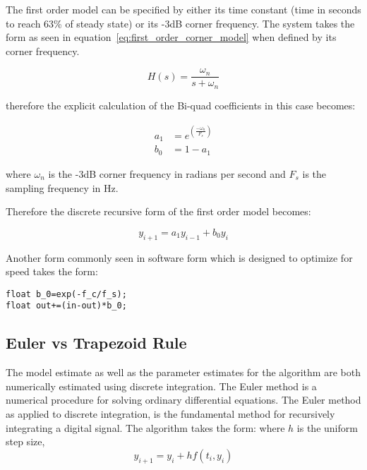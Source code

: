 The first order model can be specified by either its time constant (time in seconds to reach 63\% of steady state) or its -3dB corner frequency.  The system takes the form as seen in equation~\ref{eq:first_order_corner_model} when defined by its corner frequency.

\begin{equation}\label{eq:first_order_corner_model}
H(s)=\frac{\omega_n}{s+\omega_n}
\end{equation}

therefore the explicit calculation of the Bi-quad coefficients in this case becomes:

\begin{equation}\label{eq:first_order_coeffieicnts}
\begin{split}
	a_1&=e^{\left(\frac{-\omega_n}{F_s}\right)}  \\
	b_0&=1-a_1
\end{split}
\end{equation}

where $\omega_n$ is the -3dB corner frequency in radians per second and $F_s$ is the sampling frequency in Hz.

Therefore the discrete recursive form of the first order model becomes:

\begin{equation}
y_{i+1}=a_1y_{i-1}+b_0y_i
\end{equation}

Another form commonly seen in software form which is designed to optimize for speed takes the form:

\begin{lstlisting}
float b_0=exp(-f_c/f_s);
float out+=(in-out)*b_0;
\end{lstlisting}

\subsection{Euler vs Trapezoid Rule}

The model estimate as well as the parameter estimates for the \Lone algorithm are both numerically estimated using discrete integration.  The Euler method is a numerical procedure for solving ordinary differential equations. The Euler method as applied to discrete integration, is the fundamental method for recursively integrating a digital signal.  The algorithm takes the form: \newline
where $h$ is the uniform step size,
\begin{equation}
y_{i+1}=y_i+hf(t_i,y_i)
\end{equation}

